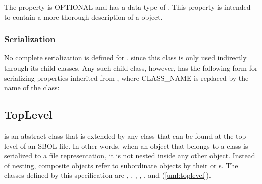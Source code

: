 The  property is OPTIONAL and has a data type of . This property is intended to contain a more thorough description of a  object.

\subsubsection*{Serialization}

No complete serialization is defined for , since this
class is only used indirectly through its child classes.  Any such
child class, however, has the following form for serializing
properties inherited from , where CLASS\_NAME is
replaced by the name of the class:







\subsection {TopLevel}
\label{sec:TopLevel}
 is an abstract class that is extended by any  class that can be found at the top level of an SBOL file. In other words, when an object that belongs to a  class is serialized to a file representation, it is not nested inside any other object. Instead of nesting, composite  objects refer to subordinate  objects by their  or  s. The  classes defined by this specification are , , , ,  , and  (\ref{uml:toplevel}).

